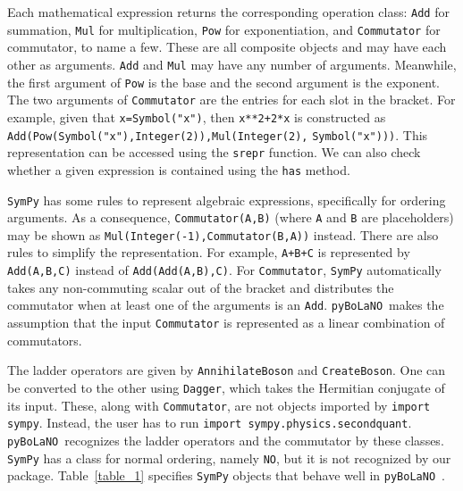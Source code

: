 \documentclass[5p, twocolumn, 10pt, sort&compress]{elsarticle}
\newcommand{\inlinecode}[1]{\texttt{#1}}
\newcommand{\pybolano}{\texttt{pyBoLaNO}~}
\begin{document}
Each mathematical expression returns the corresponding operation class: \inlinecode{Add} for summation, \inlinecode{Mul} for multiplication, \inlinecode{Pow} for exponentiation, and \inlinecode{Commutator} for commutator, to name a few. These are all composite objects and may have each other as arguments. \inlinecode{Add} and \inlinecode{Mul} may have any number of arguments. Meanwhile, the first argument of \inlinecode{Pow} is the base and the second argument is the exponent.  The two arguments of \inlinecode{Commutator} are the entries for each slot in the bracket. For example, given that \inlinecode{x=Symbol("x")}, then \inlinecode{x**2+2*x} is constructed as \inlinecode{Add(Pow(Symbol("x"),Integer(2)),Mul(Integer(2),} \inlinecode{Symbol("x")))}. This representation can be accessed using the \inlinecode{srepr} function. We can also check whether a given expression is contained using the \inlinecode{has} method.

\texttt{SymPy} has some rules to represent algebraic expressions, specifically for ordering arguments.  As a consequence, \inlinecode{Commutator(A,B)} (where \inlinecode{A} and \inlinecode{B} are placeholders) may be shown as \inlinecode{Mul(Integer(-1),Commutator(B,A))} instead. There are also rules to simplify the representation. For example, \inlinecode{A+B+C} is represented by \inlinecode{Add(A,B,C)} instead of \inlinecode{Add(Add(A,B),C)}. For \inlinecode{Commutator}, \texttt{SymPy} automatically takes any non-commuting scalar out of the bracket and distributes the commutator when at least one of the arguments is an \inlinecode{Add}. \pybolano makes the assumption that the input \inlinecode{Commutator} is represented as a linear combination of commutators. 

The ladder operators are given by \inlinecode{AnnihilateBoson} and \inlinecode{CreateBoson}. One can be converted to the other using \inlinecode{Dagger}, which takes the Hermitian conjugate of its input. These, along with \inlinecode{Commutator}, are not objects imported by \inlinecode{import sympy}. Instead, the user has to run \inlinecode{import sympy.physics.secondquant}. \pybolano recognizes the ladder operators and the commutator by these classes. \texttt{SymPy} has a class for normal ordering, namely \inlinecode{NO}, but it is not recognized by our package. Table~\ref{table_1} specifies \texttt{SymPy} objects that behave well in \pybolano.

\end{document}
